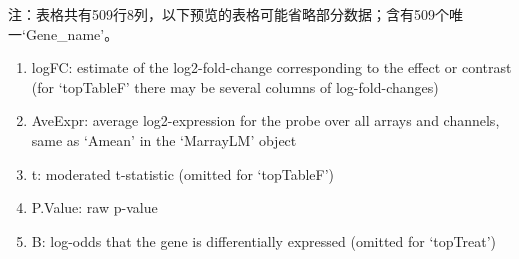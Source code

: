 \documentclass[
]{article}
\providecommand{\tightlist}{%
  \setlength{\itemsep}{0pt}\setlength{\parskip}{0pt}}
\begin{document}
\begin{center}\begin{tcolorbox}[colback=gray!10, colframe=gray!50, width=0.9\linewidth, arc=1mm, boxrule=0.5pt]注：表格共有509行8列，以下预览的表格可能省略部分数据；含有509个唯一`Gene\_name'。
\end{tcolorbox}
\end{center}
\begin{center}\begin{tcolorbox}[colback=gray!10, colframe=gray!50, width=0.9\linewidth, arc=1mm, boxrule=0.5pt]\begin{enumerate}\tightlist
\item logFC:  estimate of the log2-fold-change corresponding to the effect or contrast (for ‘topTableF’ there may be several columns of log-fold-changes)
\item AveExpr:  average log2-expression for the probe over all arrays and channels, same as ‘Amean’ in the ‘MarrayLM’ object
\item t:  moderated t-statistic (omitted for ‘topTableF’)
\item P.Value:  raw p-value
\item B:  log-odds that the gene is differentially expressed (omitted for ‘topTreat’)
\end{enumerate}\end{tcolorbox}
\end{center}
\end{document}
